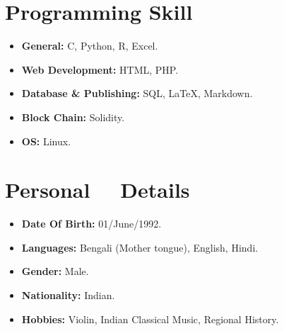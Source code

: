 \documentclass[margin,line]{res}
\begin{document}
\begin{resume}
\begin{enumerate}
\end{enumerate}


\section{\sc Programming Skill }
\begin{itemize}
\item
\textbf{General: }C, Python, R, Excel.
\item
\textbf{Web Development: }HTML, PHP.
\item
\textbf{Database \& Publishing: }SQL, \LaTeX, Markdown.
\item
\textbf{Block Chain: }Solidity.
\item
\textbf{OS: }Linux.
\end{itemize}


\section{\sc Personal ~~Details }
\begin{itemize}
\item
\textbf{Date Of Birth: }01/June/1992.
\item
\textbf{Languages: }Bengali (Mother tongue), English, Hindi.

\item
\textbf{Gender: }Male.
\item
\textbf{Nationality: }Indian.
\item
\textbf{Hobbies: }Violin, Indian Classical Music, Regional History.

\end{itemize}


\end{resume}
\end{document}
